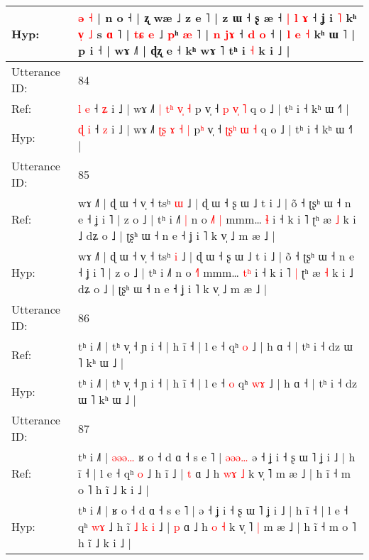 \documentclass[10pt]{article}
\DeclareRobustCommand{\hl}[1]{{\textcolor{red}{#1}}}
\begin{document}
\begin{longtable}{ll}
 \\
Hyp: & \hl{ə} \hl{˧} | n o ˧ | ʐ wæ ˩ z e ˥ | z ɯ ˧ ʂ æ ˧ \hl{|} \hl{l}\hl{ }\hl{ɤ} ˧ ʝ i \hl{˥} kʰ\hl{}\hl{}\hl{}\hl{} \hl{}\hl{v}\hl{̩} \hl{˩} s \hl{ɑ} ˥ | \hl{t}\hl{ɕ} \hl{e} ˩ \hl{p}ʰ \hl{æ} ˥ |\hl{}\hl{}\hl{}\hl{}\hl{}\hl{} \hl{n} \hl{j}\hl{ɤ} ˧\hl{}\hl{}\hl{}\hl{}\hl{} \hl{d} \hl{}\hl{o} ˧ | \hl{}\hl{l} \hl{e} \hl{˧} kʰ ɯ ˥ | p i ˧ | wɤ ˩˥ | ɖʐ e\hl{}\hl{}\hl{}\hl{}\hl{}\hl{}\hl{}\hl{} ˧ kʰ wɤ ˥ tʰ i \hl{˧} k i ˩ |
 \\
\midrule
Utterance ID: & 84 \\
Ref: & \hl{l} \hl{e} ˧ \hl{ʑ} i ˩ | wɤ ˩˥ \hl{|}\hl{ }\hl{t}\hl{ʰ} \hl{v}\hl{̩} \hl{˧} p\hl{} v̩ ˧ \hl{}\hl{p}\hl{ }\hl{v}\hl{̩} \hl{˥} q o ˩ | tʰ i ˧ kʰ ɯ ˧˥ |
 \\
Hyp: & \hl{ɖ} \hl{i} ˧ \hl{z} i ˩ | wɤ ˩˥ \hl{ʈ}\hl{ʂ}\hl{ }\hl{ɤ} \hl{}\hl{˧} \hl{|} p\hl{ʰ} v̩ ˧ \hl{ʈ}\hl{ʂ}\hl{ʰ}\hl{ }\hl{ɯ} \hl{˧} q o ˩ | tʰ i ˧ kʰ ɯ ˧˥ |
 \\
\midrule
Utterance ID: & 85 \\
Ref: & wɤ ˩˥ | ɖ ɯ ˧ v̩ ˧ tsʰ \hl{ɯ} ˩ | ɖ ɯ ˧ ʂ ɯ ˩ t i ˩ | õ ˧ ʈʂʰ ɯ ˧ n e ˧ ʝ i ˥ | z o ˩ | tʰ i ˩˥\hl{ }\hl{|} n o \hl{˩}˥\hl{ }\hl{|} mmm… \hl{}\hl{ɬ} i ˧ k i ˥\hl{}\hl{} ʈʰ æ \hl{˩} k i ˩ dʑ o ˩ | ʈʂʰ ɯ ˧ n e ˧ ʝ i ˥ k v̩ ˩ m æ ˩ |
 \\
Hyp: & wɤ ˩˥ | ɖ ɯ ˧ v̩ ˧ tsʰ \hl{i} ˩ | ɖ ɯ ˧ ʂ ɯ ˩ t i ˩ | õ ˧ ʈʂʰ ɯ ˧ n e ˧ ʝ i ˥ | z o ˩ | tʰ i ˩˥\hl{}\hl{} n o \hl{˧}˥\hl{}\hl{} mmm… \hl{t}\hl{ʰ} i ˧ k i ˥\hl{ }\hl{|} ʈʰ æ \hl{˧} k i ˩ dʑ o ˩ | ʈʂʰ ɯ ˧ n e ˧ ʝ i ˥ k v̩ ˩ m æ ˩ |
 \\
\midrule
Utterance ID: & 86 \\
Ref: & tʰ i ˩˥ | tʰ v̩ ˧ ɲ i ˧ | h ĩ ˧ | l e ˧\hl{}\hl{} qʰ \hl{}\hl{o} ˩ | h ɑ ˧ | tʰ i ˧ dz ɯ ˥ kʰ ɯ ˩ |
 \\
Hyp: & tʰ i ˩˥ | tʰ v̩ ˧ ɲ i ˧ | h ĩ ˧ | l e ˧\hl{ }\hl{o} qʰ \hl{w}\hl{ɤ} ˩ | h ɑ ˧ | tʰ i ˧ dz ɯ ˥ kʰ ɯ ˩ |
 \\
\midrule
Utterance ID: & 87 \\
Ref: & tʰ i ˩˥ |\hl{ }\hl{ə}\hl{ə}\hl{ə}\hl{…} ʁ o ˧ d ɑ ˧ s e ˥ |\hl{ }\hl{ə}\hl{ə}\hl{ə}\hl{…} ə ˧ ʝ i ˧ ʂ ɯ ˥ ʝ i ˩ | h ĩ ˧ | l e ˧ qʰ \hl{}\hl{o} ˩ h ĩ\hl{}\hl{}\hl{}\hl{}\hl{}\hl{} ˩ | \hl{t} ɑ ˩ h \hl{w}\hl{ɤ} \hl{˩} k v̩ ˥\hl{}\hl{} m æ ˩ | h ĩ ˧ m o ˥ h ĩ ˩ k i ˩ |
 \\
Hyp: & tʰ i ˩˥ |\hl{}\hl{}\hl{}\hl{}\hl{} ʁ o ˧ d ɑ ˧ s e ˥ |\hl{}\hl{}\hl{}\hl{}\hl{} ə ˧ ʝ i ˧ ʂ ɯ ˥ ʝ i ˩ | h ĩ ˧ | l e ˧ qʰ \hl{w}\hl{ɤ} ˩ h ĩ\hl{ }\hl{˩}\hl{ }\hl{k}\hl{ }\hl{i} ˩ | \hl{p} ɑ ˩ h \hl{}\hl{o} \hl{˧} k v̩ ˥\hl{ }\hl{|} m æ ˩ | h ĩ ˧ m o ˥ h ĩ ˩ k i ˩ |

\end{longtable}
\end{document}
